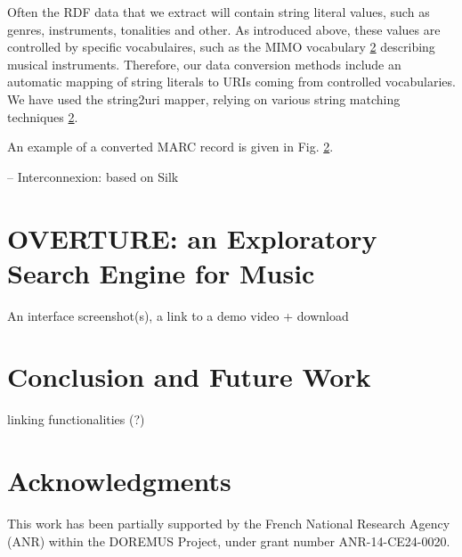\documentclass[runningheads,a4paper]{llncs}
\begin{document}
Often the RDF data that we extract will contain string literal values, such as genres, instruments, tonalities and other. As introduced above, these values are controlled by specific vocabulaires, such as the MIMO vocabulary \ref{} describing musical instruments. Therefore, our data conversion methods include an automatic mapping of string literals to URIs coming from controlled vocabularies. We have used the string2uri mapper, relying on various string matching techniques \ref{}.

An example of a converted MARC record is given in Fig. \ref{}.  

-- Interconnexion: based on Silk


\section{OVERTURE: an Exploratory Search Engine for Music}

An interface screenshot(s), a link to a demo video + download


\section{Conclusion and Future Work}

linking functionalities (?)

\section*{Acknowledgments}
This work has been partially supported by the French National Research Agency (ANR) within the DOREMUS Project, under grant number ANR-14-CE24-0020.



\end{document}
